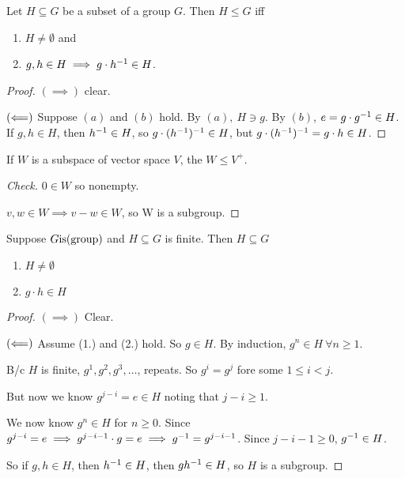 \documentclass[12pt]{article}
\begin{document}
\bbox
\begin{prop}
  Let \(H\subseteq G\) be a subset of a group \(G\). Then \(H\le G\) iff
  \begin{enumerate}
    \item \(H\neq\emptyset\) and
    \item \(g,h\in H\implies g\cdot h^{-1}\in H\).
  \end{enumerate}
\end{prop}
\ebox

\bboxproof
\begin{proof}
  \((\implies)\) clear.

  \((\Longleftarrow)\) Suppose \((a)\) and \((b)\) hold. By \((a),\ H\ni g\).
  By \((b)\), \(e=g\cdot g^{-1}\in H\).
  If \(g,h\in H\), then \(h^{-1}\in H\), so \(g\cdot(h^{-1})^{-1}\in H\),
  but \(g\cdot(h^{-1})^{-1}=g\cdot h\in H\).
\end{proof}
\ebox

\bbox
\begin{exam}
  If \(W\) is a subspace of vector space \(V\), the \(W\le V^+\).
\end{exam}
\ebox

\bboxproof
\begin{proof}[Check]
  \(0\in W\) so nonempty.

  \(v,w\in W\implies v-w\in W\), so W is a subgroup.
\end{proof}
\ebox

\bbox
\begin{prop}
  Suppose \(G\mathrm{is}(\mathrm{group})\) and \(H\subseteq G\) is finite. Then
  \(H\subseteq G\) 
  \begin{enumerate}
    \item \(H\neq\emptyset\)
    \item \(g\cdot h\in H\)
  \end{enumerate}
\end{prop}
\ebox

\bboxproof
\begin{proof}
  \((\implies)\) Clear.

  \((\Longleftarrow)\) Assume (1.) and (2.) hold. So \(g\in H\). By
  induction, \(g^n\in H\ \forall n\ge 1\).

  B/c \(H\) is finite, \(g^1,g^2,g^3,\dots\), repeats. So
  \(g^i=g^j\) fore some \(1\le i<j\).

  But now we know \(g^{j-i}=e\in H\) noting that \(j-i\ge 1\).

  We now know \(g^n\in H\) for \(n\ge 0\). Since \(g^{j-i}=e\implies
  g^{j-i-1}\cdot g=e\implies g^{-1}=g^{j-i-1}\). Since \(j-i-1\ge 0\), 
  \(g^{-1}\in H\).

  So if \(g,h\in H\), then \(h^{-1}\in H\), then \(gh^{-1}\in H\), so \(H\)
  is a subgroup.
\end{proof}
\ebox
\end{document}
